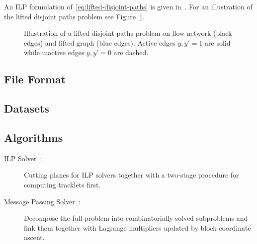An ILP formulation of~\eqref{eq:lifted-disjoint-paths} is given in~\cite{hornakova2020lifted}.
For an illustration of the lifted disjoint paths problem see Figure~\ref{fig:lifted-disjoint-paths}.

\begin{figure}[H]
\centering

\caption{
Illustration of a lifted disjoint paths problem on flow network (black edges) and lifted graph (blue edges).
Active edges $y,y' = 1$ are solid while inactive edges $y,y' = 0$ are dashed.
}
\label{fig:lifted-disjoint-paths}
\end{figure}

\subsection{File Format}

\subsection{Datasets}

\subsection{Algorithms}
\begin{description}
    \item[ILP Solver~\cite{hornakova2020lifted}:] Cutting planes for ILP solvers together with a two-stage procedure for computing tracklets first.
    \item[Message Passing Solver~\cite{hornakova2021making}:] Decompose the full problem into combinatorially solved subproblems and link them together with Lagrange multipliers updated by block coordinate ascent.
\end{description}
